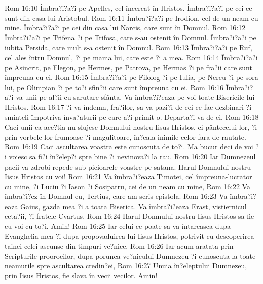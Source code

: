 Rom 16:10  Îmbra?i?a?i pe Apelles, cel încercat în Hristos. Îmbra?i?a?i pe cei ce sunt din casa lui Aristobul.
Rom 16:11  Îmbra?i?a?i pe Irodion, cel de un neam cu mine. Îmbra?i?a?i pe cei din casa lui Narcis, care sunt în Domnul.
Rom 16:12  Îmbra?i?a?i pe Trifena ?i pe Trifosa, care s-au ostenit în Domnul. Îmbra?i?a?i pe iubita Persida, care mult s-a ostenit în Domnul.
Rom 16:13  Îmbra?i?a?i pe Ruf, cel ales întru Domnul, ?i pe mama lui, care este ?i a mea.
Rom 16:14  Îmbra?i?a?i pe Asincrit, pe Flegon, pe Hermes, pe Patrova, pe Hermas ?i pe fra?ii care sunt împreuna cu ei.
Rom 16:15  Îmbra?i?a?i pe Filolog ?i pe Iulia, pe Nereu ?i pe sora lui, pe Olimpian ?i pe to?i sfin?ii care sunt împreuna cu ei.
Rom 16:16  Îmbra?i?a?i-va unii pe al?ii cu sarutare sfânta. Va îmbra?i?eaza pe voi toate Bisericile lui Hristos.
Rom 16:17  ?i va îndemn, fra?ilor, sa va pazi?i de cei ce fac dezbinari ?i sminteli împotriva înva?aturii pe care a?i primit-o. Departa?i-va de ei.
Rom 16:18  Caci unii ca ace?tia nu slujesc Domnului nostru Iisus Hristos, ci pântecelui lor, ?i prin vorbele lor frumoase ?i magulitoare, în?eala inimile celor fara de rautate.
Rom 16:19  Caci ascultarea voastra este cunoscuta de to?i. Ma bucur deci de voi ?i voiesc sa fi?i în?elep?i spre bine ?i nevinova?i la rau.
Rom 16:20  Iar Dumnezeul pacii va zdrobi repede sub picioarele voastre pe satana. Harul Domnului nostru Iisus Hristos cu voi!
Rom 16:21  Va îmbra?i?eaza Timotei, cel împreuna-lucrator cu mine, ?i Luciu ?i Iason ?i Sosipatru, cei de un neam cu mine,
Rom 16:22  Va îmbra?i?ez în Domnul eu, Tertius, care am scris epistola.
Rom 16:23  Va îmbra?i?eaza Gaius, gazda mea ?i a toata Biserica. Va îmbra?i?eaza Erast, vistiernicul ceta?ii, ?i fratele Cvartus.
Rom 16:24  Harul Domnului nostru Iisus Hristos sa fie cu voi cu to?i. Amin!
Rom 16:25  Iar celui ce poate sa va întareasca dupa Evanghelia mea ?i dupa propovaduirea lui Iisus Hristos, potrivit cu descoperirea tainei celei ascunse din timpuri ve?nice,
Rom 16:26  Iar acum aratata prin Scripturile proorocilor, dupa porunca ve?nicului Dumnezeu ?i cunoscuta la toate neamurile spre ascultarea credin?ei,
Rom 16:27  Unuia în?eleptului Dumnezeu, prin Iisus Hristos, fie slava în vecii vecilor. Amin!


